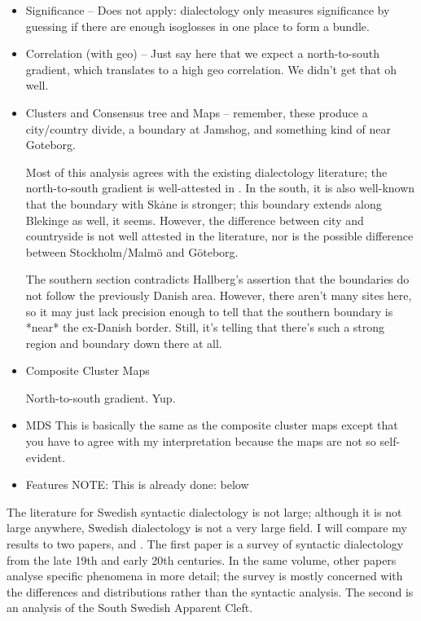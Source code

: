 \begin{itemize}
\item Significance -- Does not apply: dialectology only measures
  significance by guessing if there are enough isoglosses in one place
  to form a bundle.
\item Correlation (with geo) -- Just say here that we expect a
  north-to-south gradient, which translates to a high geo
  correlation. We didn't get that oh well.
\item Clusters and Consensus tree and Maps -- remember, these produce a
  city/country divide, a boundary at Jamshog, and something kind of
  near Goteborg.

  Most of this analysis agrees with the existing dialectology
literature; the north-to-south gradient is well-attested in
. In the south, it is also well-known that the
boundary with Sk\.ane is stronger; this boundary extends along
Blekinge as well, it seems. However, the difference between city and
countryside is not well attested in the literature, nor is the
possible difference between Stockholm/Malm\"o and G\"oteborg.

The southern section contradicts Hallberg's assertion that the
boundaries do not follow the previously Danish area. However, there
aren't many sites here, so it may just lack precision enough to tell
that the southern boundary is *near* the ex-Danish border. Still, it's
telling that there's such a strong region and boundary down there at
all.

\item Composite Cluster Maps
  
  North-to-south gradient. Yup. 
  
\item MDS
  This is basically the same as the composite cluster maps except that
  you have to agree with my interpretation because the maps are not so
  self-evident.

\item Features
NOTE: This is already done: below
\end{itemize}

The literature for Swedish syntactic dialectology is not large;
although it is not large anywhere, Swedish dialectology is not a very
large field. I will compare my results to two papers,
 and . The first paper is a
survey of syntactic dialectology from the late 19th and early 20th
centuries. In the same volume, other papers analyse specific phenomena
in more detail; the survey is mostly concerned with the differences
and distributions rather than the syntactic analysis. The second
is an analysis of the South Swedish Apparent Cleft.

